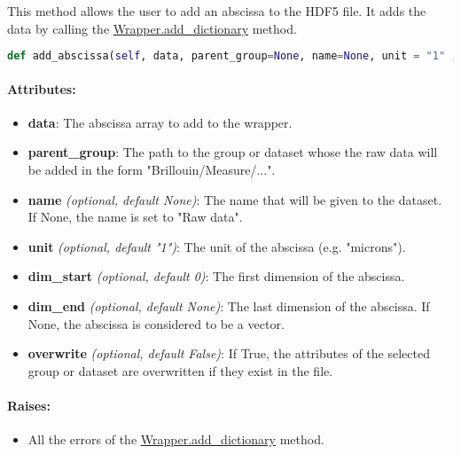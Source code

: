 This method allows the user to add an abscissa to the HDF5 file. It adds the data by calling the \hyperref[subchapter:wrapper.add_dictionary]{Wrapper.add\_dictionary} method.

\begin{lstlisting}[language=Python]
def add_abscissa(self, data, parent_group=None, name=None, unit = "1" , dim_start = 0, dim_end = None, overwrite = False):
\end{lstlisting}

\paragraph{Attributes:}

\begin{itemize}
    \item \textbf{data}: The abscissa array to add to the wrapper. 
    \item \textbf{parent\_group}: The path to the group or dataset whose the raw data will be added in the form "Brillouin/Measure/...".
    \item \textbf{name} \textit{(optional, default None)}: The name that will be given to the dataset. If None, the name is set to "Raw data".
    \item \textbf{unit} \textit{(optional, default "1")}: The unit of the abscissa (e.g. "microns").
    \item \textbf{dim\_start} \textit{(optional, default 0)}: The first dimension of the abscissa.
    \item \textbf{dim\_end} \textit{(optional, default None)}: The last dimension of the abscissa. If None, the abscissa is considered to be a vector.
    \item \textbf{overwrite} \textit{(optional, default False)}: If True, the attributes of the selected group or dataset are overwritten if they exist in the file.
\end{itemize}

\paragraph{Raises:}
\begin{itemize}
    \item All the errors of the \hyperref[subchapter:wrapper.add_dictionary]{Wrapper.add\_dictionary} method.
\end{itemize}
